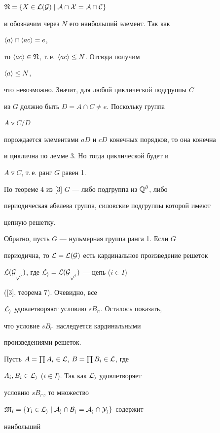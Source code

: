 \begin{pf}
$\frak N=\{X\in\cal L(G)\mid A\cap X=A\cap C\}$ 


и обозначим через $N$ его наибольший элемент. Так как 


$\langle a\rangle\cap\langle ac\rangle=e$, 


то $\langle ac\rangle\in\frak N$, т.\,е. $\langle ac\rangle\le N$. Отсюда получим 


$\langle a\rangle\le N$, 


что невозможно. Значит, для любой циклической подгруппы $C$  


из $G$ должно быть $D=A\cap C\ne e$. Поскольку группа 


$A\triangledown C/D$ 


порождается элементами $aD$ и $cD$ конечных порядков, то она конечна 


и циклична по лемме 3. Но тогда циклической будет и 


$A\triangledown C$, т.\,е. ранг $G$ равен 1. 


 


По теореме 4 из [3] $G$ --- либо подгруппа из $\Bbb Q^\partial$, либо  


периодическая абелева группа, силовские подгруппы которой имеют  


цепную решетку. 


 


Обратно, пусть $G$ --- нульмерная группа ранга 1. Если $G$ 


периодична, то $\cal L=\cal L(G)$ есть кардинальное произведение решеток 


$\cal L(G_{p_i})$, где $\cal L_i=\cal L(G_{p_i})$ --- цепь ($i\in I$) 


([3], теорема 7). Очевидно, все 


$\cal L_i$ удовлетворяют условию $sB_\cap$. Осталось показать, 


что условие $sB_\cap$ наследуется кардинальными  


произведениями решеток. 


 


Пусть $A=\prod A_i\in\cal L$, $B=\prod B_i\in\cal L$, где 


$A_i,B_i\in\cal L_i$ ($i\in I$). Так как $\cal L_i$ удовлетворяет 


условию $sB_\cap$, то множество 


$\frak M_i=\{Y_i\in\cal L_i\mid A_i\cap B_i=A_i\cap Y_i\}$ содержит 


наибольший  



\end{pf}
